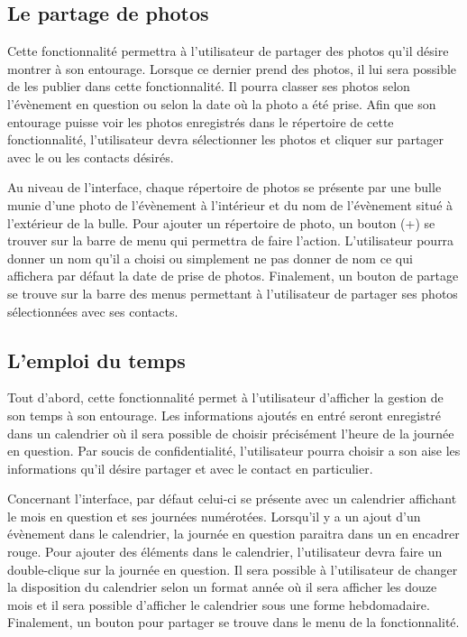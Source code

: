\documentclass[11pt]{article}
\begin{document}
\subsection{Le partage de photos}\label{par:photos}
Cette fonctionnalité permettra à l’utilisateur de partager des photos qu’il désire montrer à son entourage. Lorsque ce dernier prend des photos, il lui sera possible de les publier dans cette fonctionnalité. Il pourra classer ses photos selon l’évènement en question ou selon la date où la photo a été prise. Afin que son entourage puisse voir les photos enregistrés dans le répertoire de cette fonctionnalité, l’utilisateur devra sélectionner les photos et cliquer sur partager avec le ou les contacts désirés.

Au niveau de l’interface,  chaque répertoire de photos se présente par une bulle munie d’une photo de l’évènement à l’intérieur et du nom de l’évènement situé à l’extérieur de la bulle. Pour ajouter un répertoire de photo, un bouton (+) se trouver sur la barre de menu qui permettra de faire l’action. L’utilisateur pourra donner un nom qu’il a choisi ou simplement ne pas donner de nom ce qui affichera par défaut la date de prise de photos. Finalement, un bouton de partage se trouve sur la barre des menus permettant à l’utilisateur de partager ses photos sélectionnées avec ses contacts.
\subsection{L'emploi du temps}\label{par:cal}
Tout d’abord,  cette fonctionnalité permet à l’utilisateur d’afficher la gestion de son temps à son entourage. Les informations ajoutés en entré seront enregistré dans un calendrier où il sera possible de choisir précisément l’heure de la journée en question. Par soucis de confidentialité, l’utilisateur pourra choisir a son aise les informations qu’il désire partager et avec le contact en particulier.

Concernant l’interface, par défaut  celui-ci se présente avec un calendrier affichant le mois en question et ses journées numérotées. Lorsqu’il y a  un ajout d’un évènement dans le calendrier, la journée en question paraitra dans un en encadrer rouge. Pour ajouter des éléments dans le calendrier, l’utilisateur devra faire un double-clique sur  la journée en question. Il sera possible à l’utilisateur de changer la disposition du calendrier selon un format année où il sera afficher les douze mois et il sera possible d’afficher le calendrier sous une forme hebdomadaire. Finalement, un bouton pour partager se trouve dans le menu de la fonctionnalité.
\end{document}
